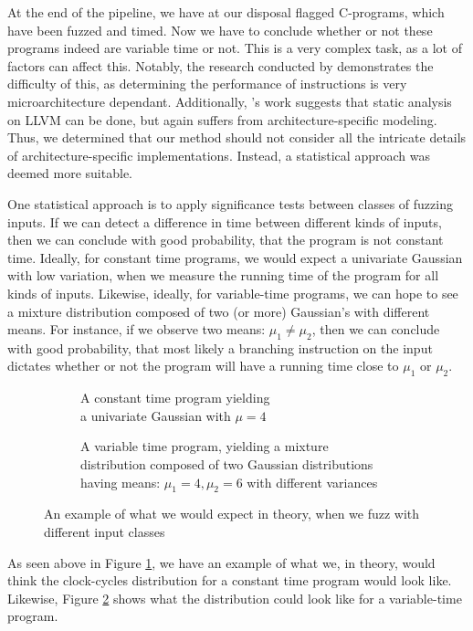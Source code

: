 \label{sec:statistical-analysis}
At the end of the pipeline, we have at our disposal flagged C-programs, which have been fuzzed and timed. Now we have to conclude whether or not these programs indeed are variable time or not. This is a very complex task, as a lot of factors can affect this. Notably, the research conducted by \citeauthor{Abel19a} demonstrates the difficulty of this, as determining the performance of instructions is very microarchitecture dependant. Additionally, \cite{Almeida16}'s work suggests that static analysis on LLVM can be done, but again suffers from architecture-specific modeling. Thus, we determined that our method should not consider all the intricate details of architecture-specific implementations. Instead, a statistical approach was deemed more suitable.

One statistical approach is to apply significance tests between classes of fuzzing inputs. If we can detect a difference in time between different kinds of inputs, then we can conclude with good probability, that the program is not constant time. Ideally, for constant time programs, we would expect a univariate Gaussian with low variation, when we measure the running time of the program for all kinds of inputs. Likewise, ideally, for variable-time programs, we can hope to see a mixture distribution composed of two (or more) Gaussian's with different means. For instance, if we observe two means: $\mu_1 \neq \mu_2$, then we can conclude with good probability, that most likely a branching instruction on the input dictates whether or not the program will have a running time close to $\mu_1$ or $\mu_2$.


\def\gausssolution{5.170045172}
\begin{figure}[H]
\captionsetup[subfigure]{justification=centering}
\begin{subfigure}[t]{0.50\textwidth}
\resizebox{\linewidth}{!}{
    
}%
\caption{A constant time program yielding\\a univariate Gaussian with $\mu = 4$}
\label{fig:univargauss}
\end{subfigure}
\begin{subfigure}[t]{0.50\textwidth}
\resizebox{\linewidth}{!}{
    
}%
\caption{A variable time program, yielding a mixture\\distribution composed of two Gaussian distributions\\having means: $\mu_1 = 4, \mu_2 = 6$ with different variances}
\label{fig:mixdisgauss}
\end{subfigure}
\caption{An example of what we would expect in theory, when we fuzz with different input classes}
\label{fig:fuzzclass-statistics-example}
\end{figure}
As seen above in Figure \ref{fig:univargauss}, we have an example of what we, in theory, would think the clock-cycles distribution for a constant time program would look like. Likewise, Figure \ref{fig:mixdisgauss} shows what the distribution could look like for a variable-time program.

